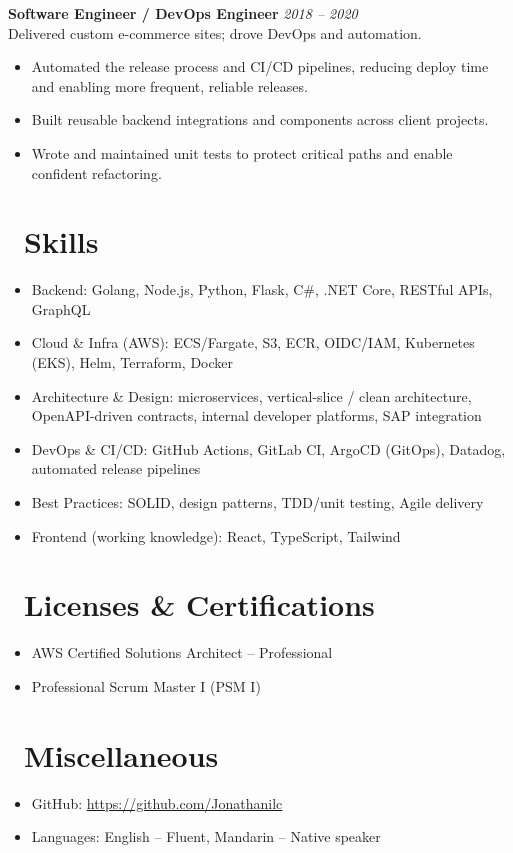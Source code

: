 \documentclass{resume}
\begin{document}
\vspace{1em}

\textbf{Software Engineer / DevOps Engineer} \hfill \textit{2018 -- 2020} \\
Delivered custom e-commerce sites; drove DevOps and automation.
\begin{itemize}
  \item Automated the release process and CI/CD pipelines, reducing deploy time and enabling more frequent, reliable releases.
  \item Built reusable backend integrations and components across client projects.
  \item Wrote and maintained unit tests to protect critical paths and enable confident refactoring.
\end{itemize}


\section{\faCogs\ Skills}
\begin{itemize}[parsep=0.5ex]
  \item Backend: Golang, Node.js, Python, Flask, C\#, .NET Core, RESTful APIs, GraphQL
  \item Cloud \& Infra (AWS): ECS/Fargate, S3, ECR, OIDC/IAM, Kubernetes (EKS), Helm, Terraform, Docker
  \item Architecture \& Design: microservices, vertical-slice / clean architecture, OpenAPI-driven contracts, internal developer platforms, SAP integration
  \item DevOps \& CI/CD: GitHub Actions, GitLab CI, ArgoCD (GitOps), Datadog, automated release pipelines
  \item Best Practices: SOLID, design patterns, TDD/unit testing, Agile delivery
  \item Frontend (working knowledge): React, TypeScript, Tailwind
\end{itemize}

\section{\faHeartO\ Licenses \& Certifications}
\begin{itemize}[parsep=0.5ex]
  \item AWS Certified Solutions Architect – Professional
  \item Professional Scrum Master I (PSM I)
\end{itemize}


\section{\faInfo\ Miscellaneous}
\begin{itemize}[parsep=0.5ex]
  \item GitHub: \url{https://github.com/Jonathanilc}
  \item Languages: English – Fluent, Mandarin – Native speaker
\end{itemize}
\end{document}
